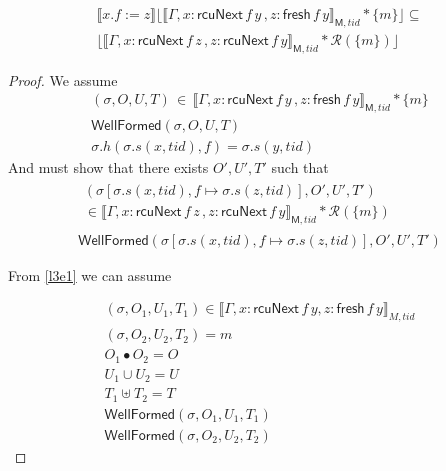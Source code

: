 \begin{Lemma}
\begin{gather}
\llbracket x.f:=z \rrbracket \lfloor \llbracket \Gamma,x:\mathsf{rcuNext} \, f \, y \, , z:\mathsf{fresh} \, f \, y \rrbracket_{\textsf{M},tid} * \{m\}\rfloor  \subseteq \\ 
\lfloor \llbracket \Gamma,x:\mathsf{rcuNext} \, f \, z \, , z:\mathsf{rcuNext} \, f \, y  \rrbracket_{\textsf{M},tid}  * \mathcal{R}(\{m\})\rfloor 
\end{gather}
\end{Lemma}
\begin{proof}
We assume 
\begin{gather} \label{l3e1}
(\sigma,O,U,T) \, \in \, \llbracket \Gamma,x:\mathsf{rcuNext} \, f \, y \, , z:\mathsf{fresh} \, f \, y \rrbracket_{\textsf{M},tid} * \{m\}
\\
\label{l3ewfa}
\textsf{WellFormed}(\sigma,O,U,T)\\
\sigma.h(\sigma.s(x,tid),f) = \sigma.s(y,tid) 
\end{gather}
And must show that there exists $O',U',T'$ such that
\begin{gather} 
\begin{split}
\label{l3e3} 
(\sigma[ \sigma.s(x,tid),f \mapsto\sigma.s(z,tid) ], O',U',T')  \\
\in \llbracket \Gamma,x:\mathsf{rcuNext} \, f \, z \, , z:\mathsf{rcuNext} \, f \, y \rrbracket_{\textsf{M},tid} * \mathcal{R}(\{m\})
\end{split}
\\
\label{l3ewfa}
\textsf{WellFormed}(\sigma[ \sigma.s(x,tid),f \mapsto\sigma.s(z,tid)],O',U',T')
\end{gather}

From \ref{l3e1} we can assume 

\begin{gather} \label{l3e4}
(\sigma, O_{1}, U_{1}, T_{1}) \in \llbracket \Gamma, x:\mathsf{rcuNext} \, f \, y, z:\mathsf{fresh} \, f \, y\rrbracket_{M,tid}
\\
 \label{l3e5}
(\sigma, O_{2}, U_{2}, T_{2}) = m 
\\
\label{l3e6}
O_{1} \bullet O_{2} = O
\\
 \label{l3e7}
U_{1} \cup U_{2} = U
\\
 \label{l3e8}
T_{1} \uplus T_{2} = T
\\
\label{l3wfa1}
\textsf{WellFormed}(\sigma,O_{1},U_{1},T_{1})
\\
\label{l3wfa2}
\textsf{WellFormed}(\sigma,O_{2},U_{2},T_{2})
\end{gather}


\end{proof}
